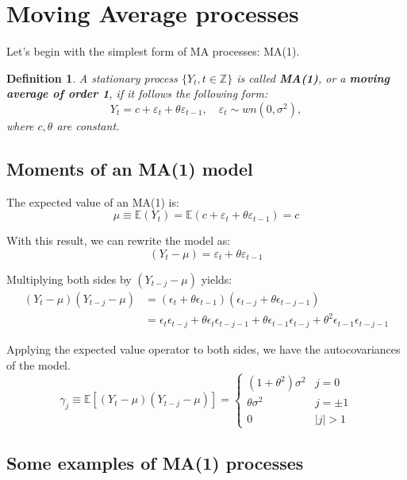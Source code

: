 \documentclass[11pt, a4paper]{report}
\theoremstyle{plain}
\theoremstyle{plain}
\newtheorem{defn}{Definition}[section]
\theoremstyle{remark}
\begin{document}
\section{Moving Average processes}

Let's begin with the simplest form of MA processes: MA(1). 
\begin{defn}
	A stationary process $\{Y_t, t \in \mathbb{Z} \}$ is called \textbf{MA(1)}, or a \textbf{moving average of order 1}, if it follows the following form:
	$$ Y_t = c + \varepsilon_t + \theta \varepsilon_{t-1}, \hspace{1em} \varepsilon_t \sim wn(0, \sigma^2), $$
	where $c, \theta$ are constant.
\end{defn}

\subsection{Moments of an MA(1) model}

The expected value of an MA(1) is:
$$
\mu \equiv \mathbb{E}\left(Y_{t}\right)=\mathbb{E}\left(c+\varepsilon_{t}+\theta \varepsilon_{t-1}\right)=c
$$

With this result, we can rewrite the model as: 
$$
\left(Y_{t}-\mu\right)=\varepsilon_{t}+\theta \varepsilon_{t-1}
$$

Multiplying both sides by $\left(Y_{t-j}-\mu\right)$ yields:
$$
\begin{aligned}
	\left(Y_{t}-\mu\right)\left(Y_{t-j}-\mu\right) &=\left(\epsilon_{t}+\theta \epsilon_{t-1}\right)\left(\epsilon_{t-j}+\theta \epsilon_{t-j-1}\right) \\
	&=\epsilon_{t} \epsilon_{t-j}+\theta \epsilon_{t} \epsilon_{t-j-1}+\theta \epsilon_{t-1} \epsilon_{t-j}+\theta^{2} \epsilon_{t-1} \epsilon_{t-j-1}
\end{aligned}
$$

Applying the expected value operator to both sides, we have the autocovariances of the model.
$$
\gamma_{j} \equiv \mathbb{E}\left[\left(Y_{t}-\mu\right)\left(Y_{t-j}-\mu\right)\right]=\left\{\begin{array}{ll}
	\left(1+\theta^{2}\right) \sigma^{2} & j=0 \\
	\theta \sigma^{2} & j=\pm 1 \\
	0 & |j|>1
\end{array}\right.
$$

\subsection{Some examples of MA(1) processes}
\end{document}
